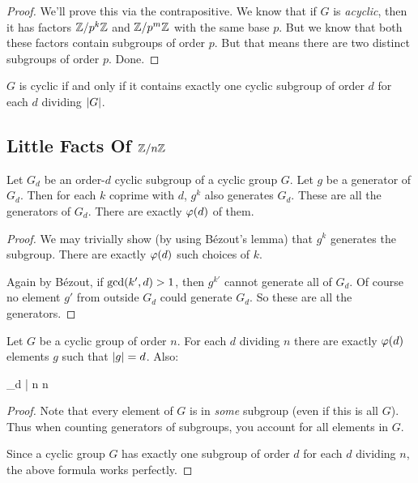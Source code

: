 \begin{proof}
  We'll prove this via the contrapositive. We know that if $G$ is
  \emph{acyclic}, then it has factors $\mathbb{Z} / p^k\mathbb{Z}$ and $\mathbb{Z} / p^m\mathbb{Z}$ with
  the same base $p$. But we know that both these factors contain
  subgroups of order $p$. But that means there are two distinct
  subgroups of order $p$. Done.
\end{proof}

\begin{theorem}
  $G$ is cyclic if and only if it contains exactly one cyclic subgroup
  of order $d$ for each $d$ dividing $|G|$.
\end{theorem}

\subsection{Little Facts Of $\mathbb{Z} / n\mathbb{Z}$}

\begin{proposition}
  Let $G_d$ be an order-$d$ cyclic subgroup of a cyclic group $G$. Let
  $g$ be a generator of $G_d$. Then for each $k$ coprime with $d$, $g^k$
  also generates $G_d$. These are all the generators of $G_d$. There are
  exactly $\varphi\mathopen{}\left( {d} \right)\mathclose{}$ of them.
\end{proposition}

\begin{proof}
  We may trivially show (by using Bézout's lemma) that $g^k$ generates
  the subgroup. There are exactly $\varphi\mathopen{}\left( {d} \right)\mathclose{}$ such choices of $k$.

  Again by Bézout, if $\gcd\mathopen{}\left( {k', d} \right)\mathclose{} > 1$, then $g^{k'}$ cannot generate
  all of $G_d$. Of course no element $g'$ from outside $G_d$ could
  generate $G_d$. So these are all the generators.
\end{proof}

\begin{corollary}
  Let $G$ be a cyclic group of order $n$. For each $d$ dividing $n$
  there are exactly $\varphi\mathopen{}\left( {d} \right)\mathclose{}$ elements $g$ such that $|g| = d$.
  Also:

  \begin{nedqn}
    \sum_{d | n} 
  \eqcol
    n
  \end{nedqn}
\end{corollary}

\begin{proof}
  Note that every element of $G$ is in \emph{some} subgroup (even if
  this is all $G$). Thus when counting generators of subgroups, you
  account for all elements in $G$.

  Since a cyclic group $G$ has exactly one subgroup of order $d$
  for each $d$ dividing $n$, the above formula works perfectly.
\end{proof}
